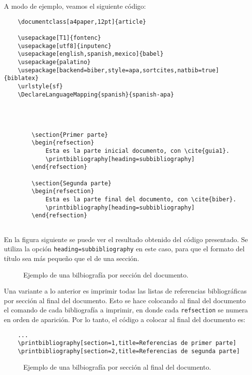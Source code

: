 A modo de ejemplo, veamos el siguiente código:
\begin{lstlisting}
	\documentclass[a4paper,12pt]{article}
	
	\usepackage[T1]{fontenc}
	\usepackage[utf8]{inputenc}
	\usepackage[english,spanish,mexico]{babel}
	\usepackage{palatino}
	\usepackage[backend=biber,style=apa,sortcites,natbib=true]{biblatex}
	\urlstyle{sf} 
	\DeclareLanguageMapping{spanish}{spanish-apa}  
	
	
	
	
		\section{Primer parte}
		\begin{refsection}
			Esta es la parte inicial documento, con \cite{guia1}.
			\printbibliography[heading=subbibliography]
		\end{refsection}
		
		\section{Segunda parte}
		\begin{refsection}
			Esta es la parte final del documento, con \cite{biber}.
			\printbibliography[heading=subbibliography]
		\end{refsection}
	
\end{lstlisting}

En la figura siguiente se puede ver el resultado obtenido del código presentado. Se utiliza la opción \verb|heading=subbibliography| en este caso, para que el formato del título sea más pequeño que el de una sección.

\begin{figure}[h]
	\centering
	\caption{Ejemplo de una bilbiografía por sección del documento.}
	\label{fig:ejemplosplitbiblio}
\end{figure}

Una variante a lo anterior es imprimir todas las listas de referencias bibliográficas por sección al final del documento. Esto se hace colocando al final del documento el comando de cada bibliografía a imprimir, en donde cada \verb|refsection| se numera en orden de aparición. Por lo tanto, el código a colocar al final del documento es:
\begin{lstlisting}
	...
	\printbibliography[section=1,title=Referencias de primer parte]
	\printbibliography[section=2,title=Referencias de segunda parte]

\end{lstlisting}

\begin{figure}[h]
\centering
{}
\caption{Ejemplo de una bilbiografía por sección al final del documento.}
\label{fig:ejemplosplitbiblio}
\end{figure}
\newpage

